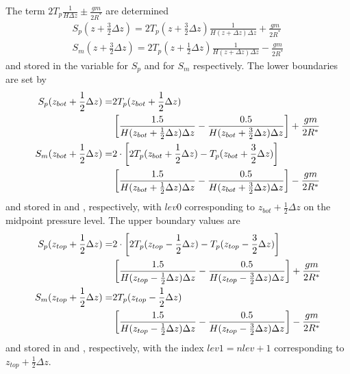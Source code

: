%
The term $2 T_p \frac{1}{H \Delta z} \pm \frac{g m}{2 R^*}$ are
determined
%
\begin{align}
  S_p(z + \frac{3}{2} \Delta z) = 2 T_p(z + \frac{3}{2} \Delta z)
       \frac{1}{H(z + \Delta z) \Delta z} + \frac{g m}{2 R^*} \label{eq:oplus_S_p}\\
  S_m(z + \frac{3}{2} \Delta z) = 2 T_p(z + \frac{1}{2} \Delta z)
       \frac{1}{H(z +  \Delta z) \Delta z} - \frac{g m}{2 R^*}\label{eq:oplus_S_m}
\end{align}
%
and stored in the variable  for $S_p$ and  
for $S_m$ respectively. The lower boundaries are set by
%
\begin{align}
  S_p(z_{bot} + \frac{1}{2} \Delta z) = & 2 T_p(z_{bot} + \frac{1}{2} \Delta
  z) \notag \\
     {} &  \left[\frac{1.5}{H(z_{bot} + \frac{1}{2}\Delta z) \Delta z}
       - \frac{0.5}{H(z_{bot} + \frac{3}{2}\Delta z) \Delta z}
       \right] + \frac{g m}{2 R^*} \label{eq:oplus_S_p_bot}\\
  S_m(z_{bot} + \frac{1}{2} \Delta z) = & 2 \cdot \left[ 2 T_p(z_{bot} + \frac{1}{2} \Delta
  z) - T_p(z_{bot} + \frac{3}{2} \Delta z)\right] \notag \\
    {} & \left[\frac{1.5}{H(z_{bot} + \frac{1}{2}\Delta z) \Delta z}
       - \frac{0.5}{H(z_{bot} + \frac{3}{2}\Delta z) \Delta z}
       \right]   - \frac{g m}{2 R^*}\label{eq:oplus_S_m_bot}
\end{align}
%
and stored in  and ,
respectively, with $lev0$ corresponding to $z_{bot} + \frac{1}{2}
\Delta z$ on the midpoint pressure level. The upper boundary values
are
%
\begin{align}
  S_p(z_{top} + \frac{1}{2} \Delta z) = & 2 \cdot \left[ 2 T_p(z_{top} - \frac{1}{2} \Delta
  z) - T_p(z_{top} - \frac{3}{2} \Delta z)\right] \notag \\
    {} & \left[\frac{1.5}{H(z_{top} - \frac{1}{2}\Delta z) \Delta z}
       - \frac{0.5}{H(z_{top} - \frac{3}{2}\Delta z) \Delta z}
       \right]   + \frac{g m}{2 R^*} \label{eq:oplus_S_p_top}\\
  S_m(z_{top} + \frac{1}{2} \Delta z) = & 2 T_p(z_{top} - \frac{1}{2} \Delta
  z) \notag \\
      {} &  \left[\frac{1.5}{H(z_{top} - \frac{1}{2}\Delta z) \Delta z}
       - \frac{0.5}{H(z_{top} - \frac{3}{2}\Delta z) \Delta z}
       \right] - \frac{g m}{2 R^*}\label{eq:oplus_S_m_top}
\end{align}
%
and stored in  and ,
respectively, with the index $lev1 = nlev + 1$ corresponding to
$z_{top} + \frac{1}{2} \Delta z$. \\

